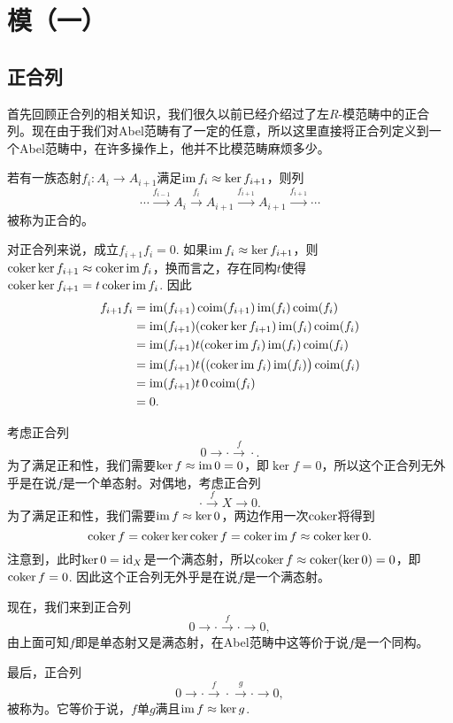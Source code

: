 
\chapter{模（一）}

\section{正合列}

首先回顾正合列的相关知识，我们很久以前已经介绍过了左$R$-模范畴中的正合列。现在由于我们对Abel范畴有了一定的任意，所以这里直接将正合列定义到一个Abel范畴中，在许多操作上，他并不比模范畴麻烦多少。

\begin{para}
若有一族态射$f_i:A_i\to A_{i+1}$满足$\operatorname{im} f_i\approx \ker f_{i+1}$，则列
\[
	\cdots \xrightarrow{f_{i-1}}A_i \xrightarrow{f_i} A_{i+1} \xrightarrow{f_{i+1}} A_{i+1}\xrightarrow{f_{i+1}}\cdots
\]
被称为正合的。
\end{para}

对正合列来说，成立$f_{i+1}f_i=0$. 如果$\operatorname{im} f_i\approx \ker f_{i+1}$，则$\operatorname{coker} \ker f_{i+1} \approx \operatorname{coker} \operatorname{im} f_i$，换而言之，存在同构$t$使得$\operatorname{coker} \ker f_{i+1}=t\operatorname{coker} \operatorname{im} f_i$. 因此
\begin{align*}
f_{i+1}f_i&=\operatorname{im}(f_{i+1})\operatorname{coim}(f_{i+1})\operatorname{im}(f_{i})\operatorname{coim}(f_{i})\\
	&=\operatorname{im}(f_{i+1})(\operatorname{coker} \ker f_{i+1}) \operatorname{im}(f_{i})\operatorname{coim}(f_{i})\\
	&=\operatorname{im}(f_{i+1})t(\operatorname{coker} \operatorname{im} f_i) \operatorname{im}(f_{i})\operatorname{coim}(f_{i})\\
	&=\operatorname{im}(f_{i+1})t\bigl((\operatorname{coker} \operatorname{im} f_i) \operatorname{im}(f_{i})\bigr)\operatorname{coim}(f_{i})\\
	&=\operatorname{im}(f_{i+1})t\,0\operatorname{coim}(f_{i})\\
	&=0.
\end{align*}

\begin{para}[短正合列]
考虑正合列
\[
	0\to \cdot \xrightarrow{f} \cdot.
\]
为了满足正和性，我们需要$\ker f \approx \operatorname{im} 0=0$，即$\ker f = 0$，所以这个正合列无外乎是在说$f$是一个单态射。对偶地，考虑正合列
\[
	\cdot\xrightarrow{f} X \to  0.
\]
为了满足正和性，我们需要$\operatorname{im} f \approx \ker 0$，两边作用一次$\operatorname{coker}$将得到
\[
	\operatorname{coker} f=\operatorname{coker} \ker \operatorname{coker} f=\operatorname{coker} \operatorname{im} f \approx \operatorname{coker} \ker 0.
\]
注意到，此时$\ker 0=\operatorname{id}_X$是一个满态射，所以$\operatorname{coker} f \approx \operatorname{coker}(\ker 0)=0$，即$\operatorname{coker} f = 0$. 因此这个正合列无外乎是在说$f$是一个满态射。

现在，我们来到正合列
\[
	0\to \cdot \xrightarrow{f} \cdot \to 0,
\]
由上面可知$f$即是单态射又是满态射，在Abel范畴中这等价于说$f$是一个同构。

最后，正合列
\[
	0\to \cdot \xrightarrow{f} \cdot \xrightarrow{g}\cdot\to 0,
\]
被称为。它等价于说，$f$单$g$满且$\operatorname{im} f\approx \ker g$.
\end{para}

